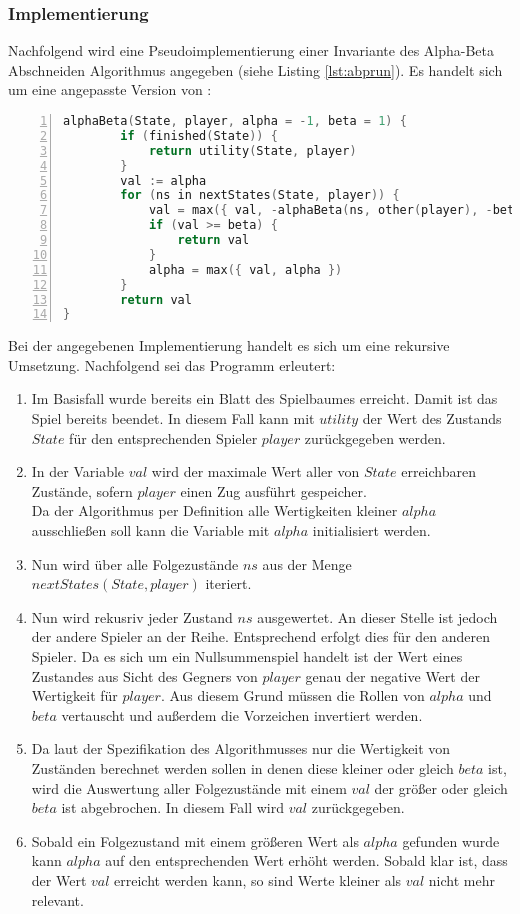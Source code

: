 \subsubsection{Implementierung}
Nachfolgend wird eine Pseudoimplementierung einer Invariante des Alpha-Beta Abschneiden Algorithmus angegeben (siehe Listing \ref{lst:abprun}). Es handelt sich um eine angepasste Version von :
\begin{lstlisting}[caption = {Pseudoimplementierung von Alpha-Beta Abschneiden}, language = cpp, captionpos = t , numbers=left, label={lst:abprun}]
alphaBeta(State, player, alpha = -1, beta = 1) {
        if (finished(State)) {
            return utility(State, player)
        }
        val := alpha
        for (ns in nextStates(State, player)) {
            val = max({ val, -alphaBeta(ns, other(player), -beta, -alpha) })
            if (val >= beta) {
                return val
            }
            alpha = max({ val, alpha })
        }
        return val
}
\end{lstlisting}
Bei der angegebenen Implementierung handelt es sich um eine rekursive Umsetzung. Nachfolgend sei das Programm erleutert:
\begin{enumerate}
\item Im Basisfall wurde bereits ein Blatt des Spielbaumes erreicht. Damit ist das Spiel bereits beendet. In diesem Fall kann mit $utility$ der Wert des Zustands $State$ für den entsprechenden Spieler $player$ zurückgegeben werden.
\item In der Variable $val$ wird der maximale Wert aller von $State$ erreichbaren Zustände, sofern $player$ einen Zug ausführt gespeicher.\\
Da der Algorithmus per Definition alle Wertigkeiten kleiner $alpha$ ausschließen soll kann die Variable mit $alpha$ initialisiert werden.
\item Nun wird über alle Folgezustände $ns$ aus der Menge $nextStates(State, player)$ iteriert.
\item Nun wird rekusriv jeder Zustand $ns$ ausgewertet. An dieser Stelle ist jedoch der andere Spieler an der Reihe. Entsprechend erfolgt dies für den anderen Spieler. Da es sich um ein Nullsummenspiel handelt ist der Wert eines Zustandes aus Sicht des Gegners von $player$ genau der negative Wert der Wertigkeit für $player$. Aus diesem Grund müssen die Rollen von $alpha$ und $beta$ vertauscht und außerdem die Vorzeichen invertiert werden.
\item Da laut der Spezifikation des Algorithmusses nur die Wertigkeit von Zuständen berechnet werden sollen in denen diese kleiner oder gleich $beta$ ist, wird die Auswertung aller Folgezustände mit einem $val$ der größer oder gleich $beta$ ist abgebrochen. In diesem Fall wird $val$ zurückgegeben.
\item Sobald ein Folgezustand mit einem größeren Wert als $alpha$ gefunden wurde kann $alpha$ auf den entsprechenden Wert erhöht werden. Sobald klar ist, dass der Wert $val$ erreicht werden kann, so sind Werte kleiner als $val$ nicht mehr relevant.  
 
\end{enumerate}

